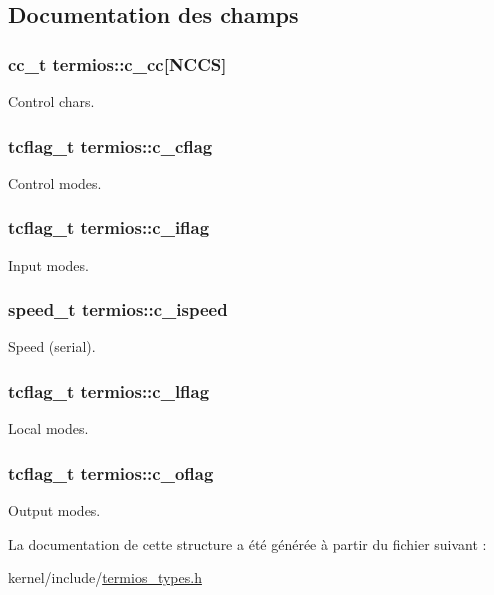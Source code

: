 \subsection{Documentation des champs}
\hypertarget{structtermios_a5fbe3e4316082afab45fc424938ef13a}{
\subsubsection[{c\-\_\-cc}]{\setlength{\rightskip}{0pt plus 5cm}cc\-\_\-t termios\-::c\-\_\-cc\mbox{[}N\-C\-C\-S\mbox{]}}}\label{structtermios_a5fbe3e4316082afab45fc424938ef13a}
Control chars. \hypertarget{structtermios_a5d42b95faa4745c3bea53652d2812162}{
\subsubsection[{c\-\_\-cflag}]{\setlength{\rightskip}{0pt plus 5cm}tcflag\-\_\-t termios\-::c\-\_\-cflag}}\label{structtermios_a5d42b95faa4745c3bea53652d2812162}
Control modes. \hypertarget{structtermios_a85b6c86d2a3db45a3829488190e357e4}{
\subsubsection[{c\-\_\-iflag}]{\setlength{\rightskip}{0pt plus 5cm}tcflag\-\_\-t termios\-::c\-\_\-iflag}}\label{structtermios_a85b6c86d2a3db45a3829488190e357e4}
Input modes. \hypertarget{structtermios_a02ae972cbc9fb2cf4a1aa6a6751a421a}{
\subsubsection[{c\-\_\-ispeed}]{\setlength{\rightskip}{0pt plus 5cm}speed\-\_\-t termios\-::c\-\_\-ispeed}}\label{structtermios_a02ae972cbc9fb2cf4a1aa6a6751a421a}
Speed (serial). \hypertarget{structtermios_a91bdd7691180800fccc4b791466ee9c3}{
\subsubsection[{c\-\_\-lflag}]{\setlength{\rightskip}{0pt plus 5cm}tcflag\-\_\-t termios\-::c\-\_\-lflag}}\label{structtermios_a91bdd7691180800fccc4b791466ee9c3}
Local modes. \hypertarget{structtermios_ad6e2cfedb81530e5a6a3a0e30b8c6362}{
\subsubsection[{c\-\_\-oflag}]{\setlength{\rightskip}{0pt plus 5cm}tcflag\-\_\-t termios\-::c\-\_\-oflag}}\label{structtermios_ad6e2cfedb81530e5a6a3a0e30b8c6362}
Output modes. 

La documentation de cette structure a été générée à partir du fichier suivant \-:\begin{DoxyCompactItemize}
\item 
kernel/include/\hyperlink{termios__types_8h}{termios\-\_\-types.\-h}\end{DoxyCompactItemize}
